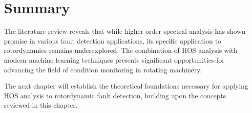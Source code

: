 \section{Summary}

The literature review reveals that while higher-order spectral analysis has shown promise in various fault detection applications, its specific application to rotordynamics remains underexplored. The combination of HOS analysis with modern machine learning techniques presents significant opportunities for advancing the field of condition monitoring in rotating machinery.

The next chapter will establish the theoretical foundations necessary for applying HOS analysis to rotordynamic fault detection, building upon the concepts reviewed in this chapter.
